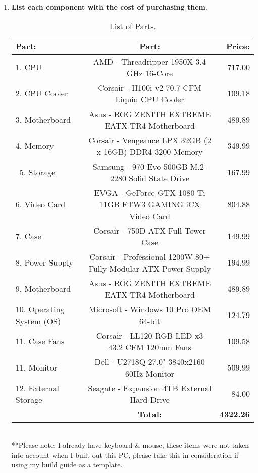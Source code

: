 \documentclass[]{article}
\begin{document}
\begin{enumerate}
\begin{enumerate}
	\item \textbf{List each component with the cost of purchasing them.}
				\smallskip

\begin{table}[h!]
	\begin{center}
		\caption{List of Parts.}
		\label{tab:table1}
		\begin{tabular}{l|c|r} %
			\textbf{Part:} & \textbf{Part:} & \textbf{Price:}\\
			\hline
			1. CPU & AMD - Threadripper 1950X 3.4 GHz 16-Core & 717.00\\
			2. CPU Cooler & Corsair - H100i v2 70.7 CFM Liquid CPU Cooler  & 109.18\\
			3. Motherboard & Asus - ROG ZENITH EXTREME EATX TR4 Motherboard & 489.89\\
			4. Memory & Corsair - Vengeance LPX 32GB (2 x 16GB) DDR4-3200 Memory & 349.99\\\
			5. Storage & Samsung - 970 Evo 500GB M.2-2280 Solid State Drive & 167.99\\
			6. Video Card &EVGA - GeForce GTX 1080 Ti 11GB FTW3 GAMING iCX Video Card & 804.88\\
			7. Case & Corsair - 750D ATX Full Tower Case & 149.99\\
			8. Power Supply & Corsair - Professional 1200W 80+ Fully-Modular ATX Power Supply & 194.99\\
			9. Motherboard & Asus - ROG ZENITH EXTREME EATX TR4 Motherboard & 489.89\\
			10. Operating System (OS) & Microsoft - Windows 10 Pro OEM 64-bit & 124.79\\
			11. Case Fans & Corsair - LL120 RGB LED x3 43.2 CFM 120mm Fans & 109.58\\
			11. Monitor & Dell - U2718Q 27.0" 3840x2160 60Hz Monitor & 509.99\\
			12. External Storage & Seagate - Expansion 4TB External Hard Drive & 84.00\\
			\hline
			& \textbf{Total:} & \textbf{4322.26}\\



	\end{tabular}
	\medskip
	\\**Please note: I already have keyboard \& mouse, these items were not taken into account when I built out this PC,  please take this in consideration if using my build guide as a template.
	\end{center}
\end{table}


\end{enumerate}
\end{enumerate}
\end{document}
